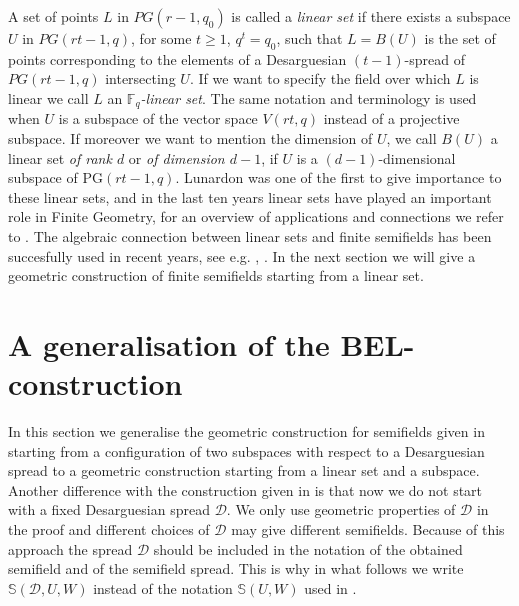 \documentclass[12pt]{amsart}
\def\PG{\mathrm{PG}}
\def\S{\mathbb{S}}
\def\D{\mathcal{D}}
\begin{document}
A set of points $L$ in $PG(r-1,q_0)$ is called a {\it linear set} if there exists a subspace $U$ in $PG(rt-1,q)$, for some $t\geq 1$, $q^t=q_0$, such that $L=B(U)$ is the set of points corresponding to the elements of a Desarguesian $(t-1)$-spread of $PG(rt-1,q)$ intersecting $U$. If we want to specify the field over which $L$ is linear we call $L$ an {\it ${\mathbb{F}}_q$-linear set}. The same notation and terminology is used when $U$ is a subspace of the vector space $V(rt,q)$ instead of a projective subspace. If moreover we want to mention the dimension of $U$, we call $B(U)$ a linear set {\it of rank $d$} or {\it of dimension $d-1$}, if $U$ is a $(d-1)$-dimensional subspace of $\PG(rt-1,q)$. Lunardon \cite{Lunardon1998} was one of the first to give importance to these linear sets, and in the last ten years linear sets have played an important role in Finite Geometry, for an overview of applications and connections we refer to \cite{Polverino200*}. The algebraic connection between linear sets and finite semifields has been succesfully used in recent years, see e.g. \cite{CaPoTr2004}, \cite{MaPoTr2007}. In the next section we will give a geometric construction of finite semifields starting from a linear set.



\section{A generalisation of the BEL-construction}

In this section we generalise the geometric construction for semifields given in \cite{BEL} starting from a configuration of two subspaces with respect to a Desarguesian spread to a geometric construction starting from a linear set and a subspace. Another difference with the construction given in \cite{BEL} is that now we do not start with a fixed Desarguesian spread $\D$. We only use geometric properties of $\D$ in the proof and different choices of $\D$ may give different semifields. Because of this approach the spread $\D$ should be included in the notation of the obtained semifield and of the semifield spread. This is why in what follows we write $\S(\D,U,W)$ instead of the notation $\S(U,W)$ used in \cite{BEL}.
\end{document}

